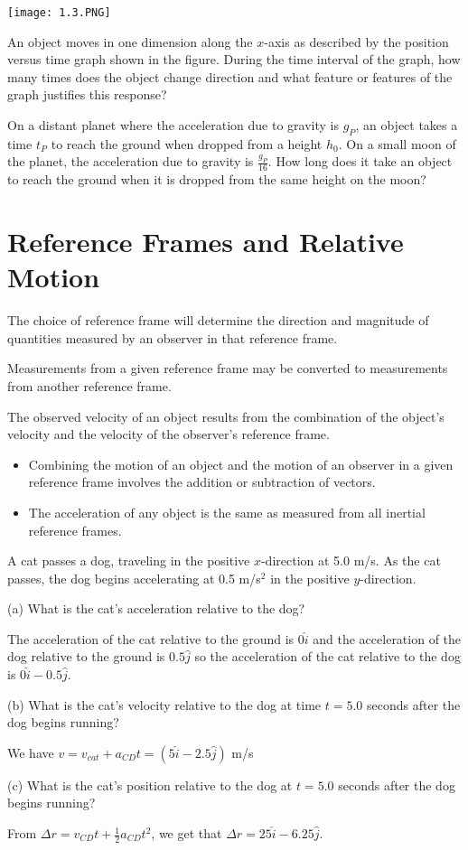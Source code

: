 \documentclass[../mech.tex]{subfiles}
\begin{document}
\ex \begin{center}
    \texttt{[image: 1.3.PNG]}
\end{center}
An object moves in one dimension along the $x$-axis as described by the position versus time graph shown in the figure. During the time interval of the graph, how many times does the object change direction and what feature or features of the graph justifies this response?

\ex On a distant planet where the acceleration due to gravity is $g_P$, an object takes a time $t_P$ to reach the ground when dropped from a height $h_0$. On a small moon of the planet, the acceleration due to gravity is $\frac{g_P}{16}$. How long does it take an object to reach the ground when it is dropped from the same height on the moon?

\section{Reference Frames and Relative Motion}
The choice of reference frame will determine the direction and magnitude of quantities measured by an observer in that reference frame.

Measurements from a given reference frame may be converted to measurements from another reference frame.

The observed velocity of an object results from the combination of the object's velocity and the velocity of the observer's reference frame.
\begin{itemize}
    \item Combining the motion of an object and the motion of an observer in a given reference frame involves the addition or subtraction of vectors.
    \item The acceleration of any object is the same as measured from all inertial reference frames.
\end{itemize}

\pagebreak
\begin{example}
    A cat passes a dog, traveling in the positive $x$-direction at 5.0 m/s. As the cat passes, the dog begins accelerating at 0.5 m/s$^2$ in the positive $y$-direction.

    (a) What is the cat's acceleration relative to the dog?

    The acceleration of the cat relative to the ground is $0\hat{i}$ and the acceleration of the dog relative to the ground is $0.5\hat{j}$ so the acceleration of the cat relative to the dog is $0\hat{i}-0.5\hat{j}$.
    
    (b) What is the cat's velocity relative to the dog at time $t=5.0$ seconds after the dog begins running?

    We have $v=v_{cat}+a_{CD}t = (5\hat{i}-2.5\hat{j})$ m/s 

    (c) What is the cat's position relative to the dog at $t=5.0$ seconds after the dog begins running?
    
    From $\Delta r = v_{CD}t+\frac{1}{2}a_{CD}t^2$, we get that $\Delta r = 25\hat{i}-6.25\hat{j}$.
\end{example}
\end{document}
